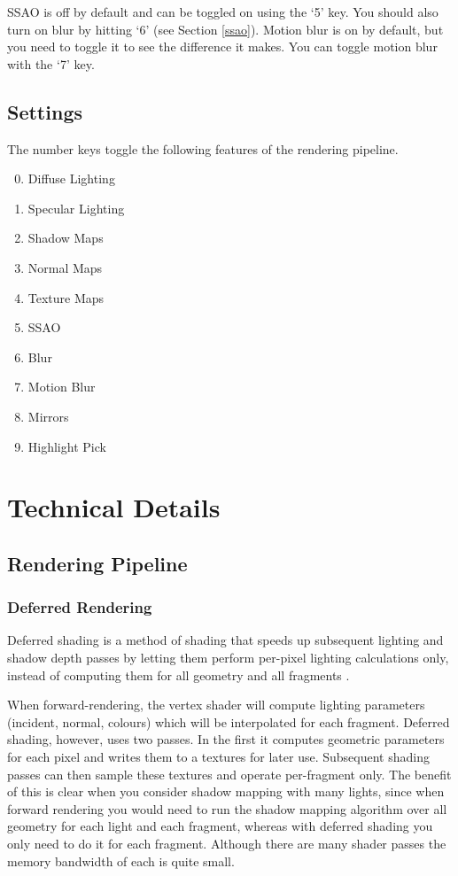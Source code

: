 \documentclass{book}
\begin{document}
    SSAO is off by default and can be toggled on using the `5' key. You should also turn on blur by hitting `6' (see Section \ref{ssao}).
    Motion blur is on by default, but you need to toggle it to see the difference it makes. You can toggle motion blur with the `7' key.

  \section{Settings}\label{settings}
    The number keys toggle the following features of the rendering pipeline.
    \begin{enumerate}
      \setcounter{enumi}{-1}
      \item Diffuse Lighting
      \item Specular Lighting
      \item Shadow Maps
      \item Normal Maps
      \item Texture Maps
      \item SSAO
      \item Blur
      \item Motion Blur
      \item Mirrors
      \item Highlight Pick
    \end{enumerate}

\chapter{Technical Details}
  \section{Rendering Pipeline}
    \subsection{Deferred Rendering} \label{deferred-rendering}
      Deferred shading is a method of shading that speeds up subsequent lighting and shadow depth passes by letting them perform per-pixel lighting calculations only, instead of computing them for all geometry and all fragments \cite{ferkoreal}.

      When forward-rendering, the vertex shader will compute lighting parameters (incident, normal, colours) which will be interpolated for each fragment. Deferred shading, however, uses two passes. In the first it computes geometric parameters for each pixel and writes them to a textures for later use. Subsequent shading passes can then sample these textures and operate per-fragment only. The benefit of this is clear when you consider shadow mapping with many lights, since when forward rendering you would need to run the shadow mapping algorithm over all geometry for each light and each fragment, whereas with deferred shading you only need to do it for each fragment. Although there are many shader passes the memory bandwidth of each is quite small.
\end{document}
